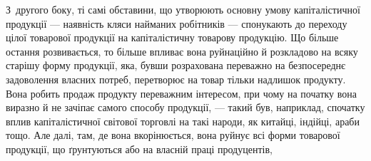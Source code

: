 З~другого боку, ті самі обставини, що утворюють основну умову капіталістичної продукції — наявність
кляси найманих робітників — спонукають до переходу цілої товарової продукції на капіталістичну
товарову продукцію. Що більше остання розвивається, то більше впливає вона руйнаційно й розкладово
на всяку старішу форму продукції, яка, бувши розрахована переважно на безпосереднє задоволення
власних потреб, перетворює на товар тільки надлишок продукту. Вона робить продаж продукту
переважним інтересом, при чому на початку вона виразно й не зачіпає самого способу продукції, —
такий був, наприклад, спочатку вплив капіталістичної світової торговлі на такі народи, як китайці,
індійці, араби тощо. Але далі, там, де вона вкорінюється, вона руйнує всі форми товарової продукції,
що ґрунтуються або на власній праці продуцентів,
\parbreak{}  %
